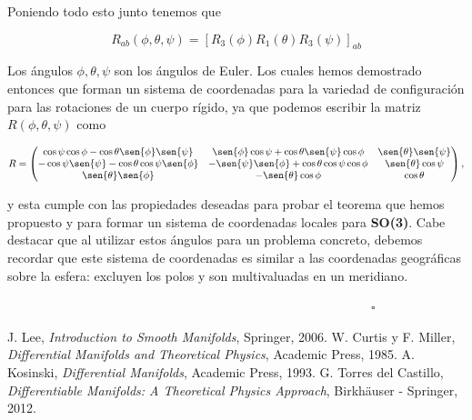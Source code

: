 \documentclass[a4paper,10pt]{article}
\numberwithin{equation}{section}
\begin{document}
Poniendo todo esto junto tenemos que 

\begin{equation}
 R_{ab} (\phi,\theta,\psi) = [R_3(\phi)R_1(\theta)R_3(\psi)]_{ab}
\end{equation}

Los ángulos $\phi,\theta,\psi$ son los ángulos de Euler. Los cuales hemos demostrado 
entonces que forman un sistema de coordenadas para la variedad de configuración 
para las rotaciones de un cuerpo rígido, ya que podemos escribir la matriz $R(\phi,\theta,\psi)$
como 

\begin{equation*}
 R  = \begin{pmatrix}
              \cos{\psi}\cos{\phi} - \cos{\theta}\sen{\phi}\sen{\psi} & 
              \sen{\phi}\cos{\psi} + \cos{\theta}\sen{\psi}\cos{\phi} & 
              \sen{\theta}\sen{\psi} \\
	      -\cos{\psi}\sen{\psi} - \cos{\theta}\cos{\psi}\sen{\phi} & 
	      -\sen{\psi}\sen{\phi} + \cos{\theta}\cos{\psi}\cos{\phi} & 
	      \sen{\theta}\cos{\psi} \\
	      \sen{\theta}\sen{\phi} & -\sen{\theta}\cos{\phi} & \cos{\theta}
	     \end{pmatrix},
\end{equation*}

y esta cumple con las propiedades deseadas para probar el teorema que hemos propuesto 
y para formar un sistema de coordenadas locales para \textbf{SO(3)}. Cabe destacar 
que al utilizar estos ángulos para un problema concreto, debemos recordar que este 
sistema de coordenadas es similar a las coordenadas geográficas sobre la esfera: excluyen 
los polos y son multivaluadas en un meridiano.

$\hspace{12cm} \square$

\begin{thebibliography}{10}
J. Lee, \emph{Introduction to Smooth Manifolds}, Springer, 2006.
W. Curtis y F. Miller, \emph{Differential Manifolds and Theoretical Physics}, Academic 
Press, 1985.
A. Kosinski, \emph{Differential Manifolds}, Academic Press, 1993.
G. Torres del Castillo, \emph{Differentiable Manifolds: A Theoretical Physics Approach}, 
Birkhäuser - Springer, 2012.
\end{thebibliography}
\end{document}
